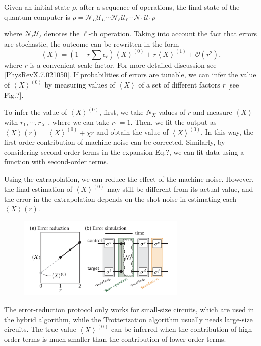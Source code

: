 \documentclass[11pt, oneside]{article}   	%
\begin{document}
Given an initial state $\rho$, after a sequence of operations, the final state of the quantum computer is
$\rho = \mathcal{N}_L \mathcal{U}_L \cdots \mathcal{N}_{\ell} \mathcal{U}_{\ell} \cdots \mathcal{N}_1 \mathcal{U}_1 \rho$

where $\mathcal{N}_{\ell} \mathcal{U}_{\ell}$ denotes the $\ell$-th operation. 
Taking into account the fact that errors are stochastic, the outcome can be rewritten in the form
\begin{equation}
\left< X \right> = \left(1 - r \sum \epsilon_{\ell} \right) \left< X \right>^{(0)} + r  \left< X \right>^{(1)} + \mathcal{O}(r^2),
\end{equation}
where $r$ is a convenient scale factor. 
For more detailed discussion see [PhysRevX.7.021050].
If probabilities of errors are tunable, we can infer the value of $\left< X \right>^{(0)}$ by measuring values of $\left< X \right>$ of a set of
different factors $r$ [see Fig.?]. 

To infer the value of $\left< X \right>^{(0)}$, first, we take $N_X$ values of $r$ and measure $\left< X \right>$ with $r_1, \cdots, r_X$ , where
we can take $r_1 = 1$. 
Then, we fit the output as $\left< X \right> (r) = \left< X \right>^{(0)} + \chi r$ and obtain the value of $\left< X \right>^{(0)}$.
In this way, the first-order contribution of machine noise can be corrected. 
Similarly, by considering second-order terms in the expansion Eq.?, we can fit data using a function with second-order terms.

Using the extrapolation, we can reduce the effect of the machine noise. 
However, the final estimation of $\left< X \right>^{(0)}$ may still be different from its actual value, and the error in the extrapolation depends on the shot noise in estimating each $\left< X \right> (r)$.

\begin{figure}[t]
\includegraphics[width=8cm]{./img/PRX7_021050}
\centering
\end{figure}

The error-reduction protocol only works for small-size circuits, which are used in the hybrid algorithm, while the Trotterization algorithm usually needs large-size circuits. 
The true value $\left< X \right>^{(0)}$ can be inferred when the contribution of high-order terms is much smaller than the contribution of lower-order terms.
\end{document}
